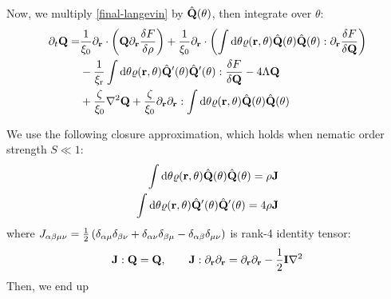 \documentclass[a5paper]{article}
\begin{document}
Now, we multiply \cref{final-langevin} by $\hat{\mathbf{Q}}(\theta)$, then integrate over $\theta$:
\begin{align}
    \partial_t \mathbf{Q} =& 
    \frac{1}{\xi_0}\partial_{\mathbf{r}} \cdot\left(\mathbf{Q} \partial_{\mathbf{r}} \frac{\delta F}{\delta \rho}\right)
    +\frac{1}{\xi_0}\partial_{\mathbf{r}} \cdot\left(
        \int \mathrm{d}\theta \varrho(\mathbf{r}, \theta) \hat{\mathbf{Q}}(\theta) \hat{\mathbf{Q}}(\theta) : \partial_{\mathbf{r}} \frac{\delta F}{\delta \mathbf{Q}}\right)
\\    
    &-\frac{1}{\xi_{\rm r}}\int \mathrm{d}\theta \varrho(\mathbf{r}, \theta) \hat{\mathbf{Q}}'(\theta)\hat{\mathbf{Q}}'(\theta) : \frac{\delta F}{\delta \mathbf{Q}}-4\Lambda \mathbf{Q}
    \\
    &+\frac{\zeta}{\xi_0}\nabla^2 \mathbf{Q} + \frac{\zeta}{\xi_0} \partial_{\mathbf{r}}\partial_{\mathbf{r}} : \int \mathrm{d}\theta \varrho(\mathbf{r}, \theta) \hat{\mathbf{Q}}(\theta) \hat{\mathbf{Q}}(\theta)
\end{align} 

We use the following closure approximation, which holds when nematic order strength $S\ll 1$:
\begin{align}
    \int \mathrm{d}\theta \varrho(\mathbf{r}, \theta) \hat{\mathbf{Q}}(\theta) \hat{\mathbf{Q}}(\theta) = \rho \mathbf{J}
    \\
    \int \mathrm{d}\theta \varrho(\mathbf{r}, \theta) \hat{\mathbf{Q}}'(\theta)\hat{\mathbf{Q}}'(\theta) = 4\rho \mathbf{J}
\end{align}
where $J_{{\alpha\beta\mu\nu}} =\frac{1}{2}\left(\delta_{\alpha\mu}\delta_{\beta\nu} + \delta_{\alpha\nu}\delta_{\beta\mu} - \delta_{\alpha\beta}\delta_{\mu\nu}\right)$ is rank-4 identity tensor:
\begin{align}
    \mathbf{J}:\mathbf{Q}  = \mathbf{Q},
    \qquad
    \mathbf{J} : \partial_{\mathbf{r}}\partial_{\mathbf{r}}  = 
    \partial_{\mathbf{r}}\partial_{\mathbf{r}} -\frac{1}{2}\mathbf{I} \nabla^2
\end{align}
Then, we end up
\end{document}
